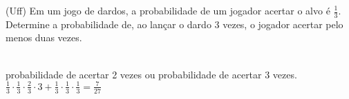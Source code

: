 \begin{ex}
 (Uff) Em um jogo de dardos, a probabilidade de um jogador acertar o alvo é $\frac{1}{3}$.  Determine a probabilidade de, ao lançar o dardo 3 vezes, o jogador acertar pelo menos duas vezes.
   \begin{sol}
     \phantom{A}\\
     probabilidade de acertar 2 vezes ou probabilidade de acertar 3 vezes. \\
     $\frac{1}{3}\cdot\frac{1}{3}\cdot\frac{2}{3}\cdot3+\frac{1}{3}\cdot\frac{1}{3}\cdot\frac{1}{3}=\frac{7}{27} $
   \end{sol}
\end{ex}